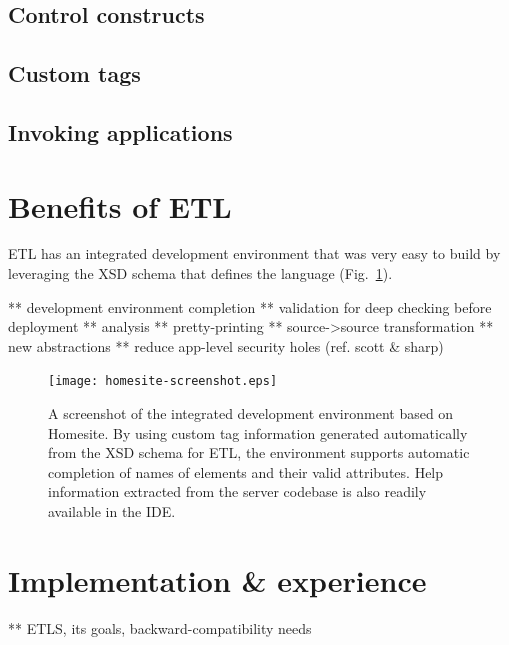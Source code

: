\documentclass{www2003-submission}
\newcommand{\figref}[1]{Fig.~\ref{fig-#1}}
\begin{document}

\subsection{Control constructs}

\subsection{Custom tags}

\subsection{Invoking applications}


\section{Benefits of ETL}

ETL has an integrated development environment that was very
easy to build by leveraging the XSD schema that defines the language
(\figref{homesite-screenshot}).

** development environment completion
** validation for deep checking before deployment
** analysis 
** pretty-printing 
** source->source transformation 
** new abstractions 
** reduce app-level security holes (ref. scott \& sharp)


\begin{figure}[tb]
\begin{centering}
\hspace*{-0.05\linewidth}\texttt{[image: homesite-screenshot.eps]}
\caption{A screenshot of the integrated development environment based
on Homesite.  By using custom tag information generated automatically
from the XSD schema for ETL, the environment supports automatic
completion of names of elements and their valid attributes.  Help
information extracted from the server codebase is also readily
available in the IDE\@.
\label{fig-homesite-screenshot}}
\end{centering}
\end{figure}


\section{Implementation \& experience}

** ETLS, its goals, backward-compatibility needs
\end{document}
